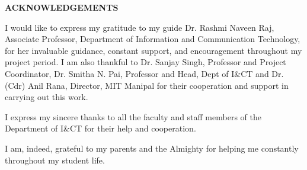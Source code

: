 \begin{center}
\large{\textbf{ACKNOWLEDGEMENTS}}\\
\vspace{1cm}
\end{center}



I would like to express my gratitude to my guide Dr. Rashmi Naveen Raj, Associate Professor, Department of Information and Communication Technology, for her invaluable guidance, constant support, and encouragement throughout my project period. I am also thankful to Dr. Sanjay Singh, Professor and Project Coordinator, Dr. Smitha N. Pai, Professor and Head, Dept of I\&CT and Dr. (Cdr) Anil Rana, Director, MIT Manipal for their cooperation and support in carrying out this work.

I express my sincere thanks to all the faculty and staff members of the Department of I\&CT for their help and cooperation. 

I am, indeed, grateful to my parents and the Almighty for helping me constantly throughout my student life. 

